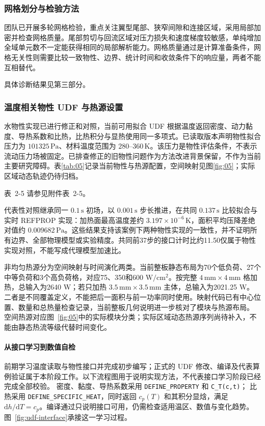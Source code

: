 \documentclass[UTF8]{midterm}
\makeatletter
\newcommand{\submissionnumber}[1]{\def\@currentlabel{#1}}
\makeatother
\begin{document}
\subsubsection{网格划分与检验方法}
团队已开展多轮网格检验，重点关注翼型尾部、狭窄间隙和连接区域，采用局部加密并检查网格质量。尾部剪切与回流区域对压力损失和速度梯度较敏感，单纯增加全域单元数不一定能获得相同的局部解析能力。网格质量通过是计算准备条件，网格无关性则需要比较一致物性、边界、统计时间和收敛条件下的响应量，两者不能互相替代。


具体诊断结果见第三部分。

\subsubsection{温度相关物性 UDF 与热源设置}
水物性实现已进行修正和对照，当前可用拟合 UDF 根据温度返回密度、动力黏度、导热系数和比热，比热积分与显热使用同一多项式。已读取版本声明物性拟合压力为 $101325\,\mathrm{Pa}$、材料温度范围为 $280$--$360\,\mathrm{K}$。该压力是物性评估条件，不表示流动压力场被固定。已排查修正的旧物性问题作为方法改进背景保留，不作为当前主要研究障碍。表\ref{tab:05}记录当前物性与热源配置，空间映射见图\ref{fig:05}；实际区域动态轨迹仍待归档。

\par\noindent \begingroup\submissionnumber{2-5}\label{tab:05}\endgroup 表~2-5 请参见附件表~2-5。\par


代表性对照继承同一 $0.1\,\mathrm{s}$ 初场，以 $0.001\,\mathrm{s}$ 步长推进，在共同 $0.137\,\mathrm{s}$ 比较拟合与实时 REFPROP 实现：加热面最高温度差约 $3.197\times10^{-6}\,\mathrm{K}$，面积平均压降差绝对值约 $0.009682\,\mathrm{Pa}$。这些结果支持该案例下两种物性实现的一致性，并不证明所有边界、全部物理模型或实验精度。共同前37步的接口计时比约11.50仅属于物性实现对照，不能写成代理模型加速比。

非均匀热源分为空间映射与时间演化两类。当前整板静态布局为70个低负荷、27个中等负荷和3个高负荷格，对应75、350和600 $\mathrm{W/cm^2}$。按完整 $4\,\mathrm{mm}\times4\,\mathrm{mm}$ 格加热，总输入为2640 W；若只加热 $3.5\,\mathrm{mm}\times3.5\,\mathrm{mm}$ 主体，总输入为2021.25 W。二者是不同覆盖定义，不能把后一面积与前一功率同时使用。映射代码已有中心位置、数量和总热量检查记录，当前整板几何说明进一步核对了模块与热源布局。
\noindent 空间热源对应图~\ref{fig:05}中的实际模块分类；实际区域动态热源序列尚待补入，不能由静态热流等级代替时间变化。


\paragraph{从接口学习到数值自检}
前期学习温度读取与物性接口并完成初步编写；正式的 UDF 修改、编译及代表算例验证属于本阶段工作。以下流程图用于说明实现方法，不代表接口学习阶段已经完成全部校验。
密度、黏度、导热系数采用 \texttt{DEFINE\_PROPERTY} 和 \texttt{C\_T(c,t)}；
比热采用 \texttt{DEFINE\_SPECIFIC\_HEAT}，同时返回 $c_p(T)$ 和其积分显焓，满足
$\mathrm dh/\mathrm dT=c_p$。编译通过只说明接口可用，仍需检查适用温区、数值与变化趋势。
图~\ref{fig:udf-interface}承接这一学习过程。
\end{document}
